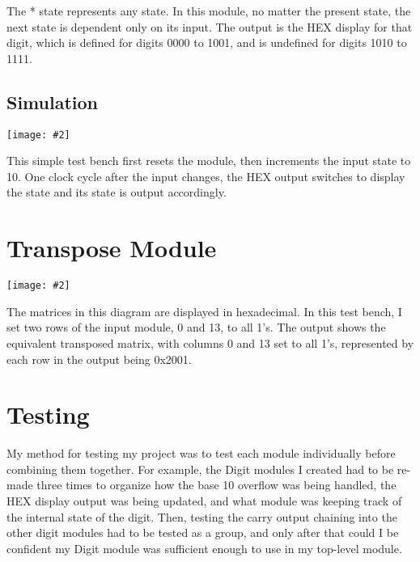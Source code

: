 \documentclass{article}
\newenvironment{solution}{\begin{mdframed}[style=SolutionFrame]}{\end{mdframed}}
\newcommand{\img}[2][1.0]{
    \begin{minipage}[t]{\linewidth}
        \begin{center}
            \texttt{[image: \#2]}
        \end{center}
    \end{minipage}
}
\begin{document}
\begin{solution}
\begin{center}
        \end{center}
        The * state represents any state. In this module, no matter the present state, the next state is dependent only on its input. The output is the HEX display for that digit, which is defined for digits 0000 to 1001, and is undefined for digits 1010 to 1111.
    \end{solution}

\newpage
\subsection{Simulation}
    \begin{solution}
        \img{digit_display_waves.png}
        This simple test bench first resets the module, then increments the input state to 10. One clock cycle after the input changes, the HEX output switches to display the state and its state is output accordingly.
    \end{solution}

\section{Transpose Module}
    \begin{solution}
        \img{transpose_waves.png}
        The matrices in this diagram are displayed in hexadecimal. In this test bench, I set two rows of the input module, 0 and 13, to all 1's. The output shows the equivalent transposed matrix, with columns 0 and 13 set to all 1's, represented by each row in the output being 0x2001.
    \end{solution}

\section{Testing}
    \begin{solution}
        My method for testing my project was to test each module individually before combining them together. For example, the Digit modules I created had to be re-made three times to organize how the base 10 overflow was being handled, the HEX display output was being updated, and what module was keeping track of the internal state of the digit. Then, testing the carry output chaining into the other digit modules had to be tested as a group, and only after that could I be confident my Digit module was sufficient enough to use in my top-level module.
    \end{solution}
\end{document}
